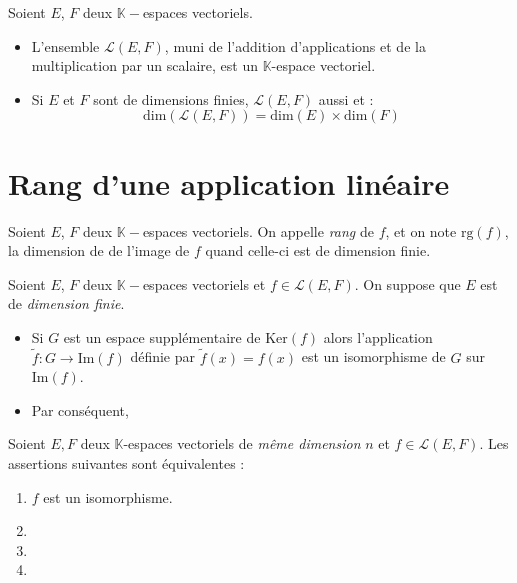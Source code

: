 \documentclass[a4paper,10pt]{report}
\begin{document}
\begin{prop} Soient $E$, $F$ deux $\mathbb{K}-$espaces vectoriels.

\begin{itemize}
\item L'ensemble $\mathcal{L}(E,F)$, muni de l'addition d'applications et de la multiplication par un scalaire, est un $\mathbb{K}$-espace vectoriel.
\item Si $E$ et $F$ sont de dimensions finies, $\mathcal{L}(E,F)$ aussi et :
$$ \textrm{dim}( \mathcal{L}(E,F)) = \textrm{dim}(E) \times \textrm{dim}(F)$$
\end{itemize}
\end{prop}

\section{Rang d'une application linéaire}

\begin{defin} Soient $E$, $F$ deux $\mathbb{K}-$espaces vectoriels. On appelle \textit{rang} de $f$, et on note $\textrm{rg}(f)$, la dimension de de l'image de $f$ quand celle-ci est de dimension finie.
\end{defin}

\begin{thm} Soient $E$, $F$ deux $\mathbb{K}-$espaces vectoriels et $f \in \mathcal{L}(E,F)$. On suppose que $E$ est de \textit{dimension finie}.

\begin{itemize}
\item Si $G$ est un espace supplémentaire de $\textrm{Ker}(f)$ alors l'application $\tilde{f} : G \rightarrow\textrm{Im}(f)$ définie par \newline $\tilde{f}(x)=f(x)$ est un isomorphisme de $G$ sur $\textrm{Im}(f)$.
\item Par conséquent, 
\end{itemize}
\end{thm}

\begin{thm} Soient $E, F$ deux $\mathbb{K}$-espaces vectoriels de \textit{même dimension} $n$ et $f \in \mathcal{L}(E,F)$. Les assertions suivantes sont équivalentes :

\begin{enumerate}
\item $f$ est un isomorphisme.
\item \phantom{$f$ est injective.}
\item \phantom{$f$ est surjective.}
\item \phantom{Le rang de $f$ est égal à $n$.}
\end{enumerate}
\end{thm}
\end{document}
